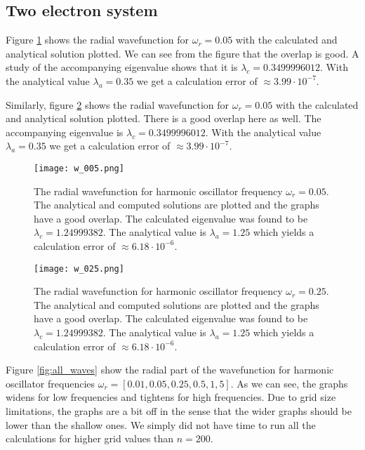 \documentclass{emulateapj}
\begin{document}
    \subsection{\textbf{Two electron system}}
        
        Figure \ref{fig:w_005} shows the radial wavefunction for $\omega_r = 0.05$ with the calculated and analytical solution plotted. We can see from the figure that the overlap is good.
        A study of the accompanying eigenvalue shows that it is $\lambda_c = 0.3499996012$. With the analytical value $\lambda_a = 0.35$ we get a calculation error of $\approx 3.99 \cdot 10^{-7}$.
        
        Similarly, figure \ref{fig:w_025} shows the radial wavefunction for $\omega_r = 0.05$ with the calculated and analytical solution plotted. There is a good overlap here as well.
        The accompanying eigenvalue is $\lambda_c = 0.3499996012$. With the analytical value $\lambda_a = 0.35$ we get a calculation error of $\approx 3.99 \cdot 10^{-7}$.
        
        \begin{figure}[t]
            \centering
            \texttt{[image: w\_005.png]}
            \caption{The radial wavefunction for harmonic oscillator frequency $\omega_r = 0.05$. The analytical and computed solutions are plotted and the graphs have a good overlap. The calculated eigenvalue was found to be $\lambda_c = 1.24999382$. The analytical value is $\lambda_a = 1.25$ which yields a calculation error of $\approx 6.18 \cdot 10^{-6}$.}
            \label{fig:w_005}
        \end{figure}{}
        
        
        \begin{figure}[t]
            \centering
            \texttt{[image: w\_025.png]}
            \caption{The radial wavefunction for harmonic oscillator frequency $\omega_r = 0.25$. The analytical and computed solutions are plotted and the graphs have a good overlap. The calculated eigenvalue was found to be $\lambda_c = 1.24999382$. The analytical value is $\lambda_a = 1.25$ which yields a calculation error of $\approx 6.18 \cdot 10^{-6}$.}
            \label{fig:w_025}
        \end{figure}{}
        
        Figure \ref{fig:all_waves} show the radial part of the wavefunction for harmonic oscillator frequencies $\omega_r = [0.01, 0.05, 0.25, 0.5, 1, 5]$. As we can see, the graphs widens for low frequencies and tightens for high frequencies. Due to grid size limitations, the graphs are a bit off in the sense that the wider graphs should be lower than the shallow ones. We simply did not have time to run all the calculations for higher grid values than $n = 200$. 
        
\end{document}
